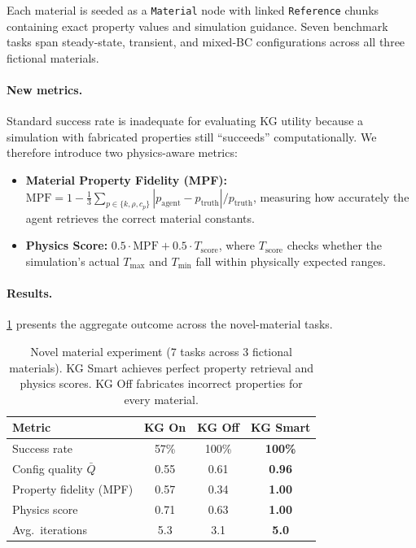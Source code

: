 \documentclass[twocolumn]{article}
\begin{document}
Each material is seeded as a \texttt{Material} node with linked
\texttt{Reference} chunks containing exact property values and
simulation guidance.  Seven benchmark tasks span steady-state, transient,
and mixed-BC configurations across all three fictional materials.

\paragraph{New metrics.}
Standard success rate is inadequate for evaluating KG utility because
a simulation with fabricated properties still ``succeeds''
computationally.  We therefore introduce two physics-aware metrics:
\begin{itemize}
  \item \textbf{Material Property Fidelity (MPF):}
        $\text{MPF} = 1 - \frac{1}{3}\sum_{p \in \{k,\rho,c_p\}}
        |p_\text{agent} - p_\text{truth}| / p_\text{truth}$, measuring
        how accurately the agent retrieves the correct material constants.
  \item \textbf{Physics Score:} $0.5 \cdot \text{MPF} + 0.5 \cdot
        T_\text{score}$, where $T_\text{score}$ checks whether the
        simulation's actual $T_\text{max}$ and $T_\text{min}$ fall within
        physically expected ranges.
\end{itemize}

\paragraph{Results.}
\cref{tab:novidium} presents the aggregate outcome across the
novel-material tasks.

\begin{table}[htbp]
\centering\footnotesize
\caption{Novel material experiment (7 tasks across 3 fictional materials).
  KG Smart achieves perfect property retrieval and physics scores.
  KG Off fabricates incorrect properties for every material.}
\label{tab:novidium}
\setlength{\tabcolsep}{4pt}
\begin{tabular}{lccc}
\toprule
Metric & KG On & KG Off & KG Smart \\
\midrule
  Success rate              & 57\%  & 100\%          & \textbf{100\%} \\
  Config quality $\bar{Q}$  & 0.55  & 0.61           & \textbf{0.96}  \\
  Property fidelity (MPF)   & 0.57  & 0.34           & \textbf{1.00}  \\
  Physics score             & 0.71  & 0.63           & \textbf{1.00}  \\
  Avg.\ iterations          & 5.3   & 3.1            & \textbf{5.0}   \\
\bottomrule
\end{tabular}
\end{table}
\end{document}

